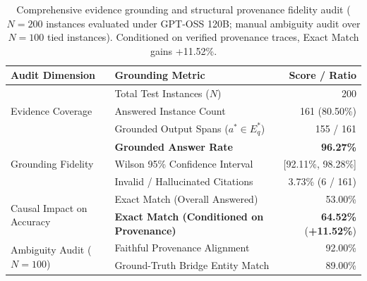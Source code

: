 \documentclass[runningheads]{llncs}
\begin{document}
\begin{table}[t]
\caption{Comprehensive evidence grounding and structural provenance fidelity audit ($N=200$ instances evaluated under GPT-OSS 120B; manual ambiguity audit over $N=100$ tied instances). Conditioned on verified provenance traces, Exact Match gains +11.52\%.}
\label{tab:evidence-audit}
\vspace{0.5mm}
\centering
\scriptsize
\renewcommand{\arraystretch}{0.80}
\setlength{\tabcolsep}{7pt}
\begin{tabular}{@{}llr@{}}
\toprule
\textbf{Audit Dimension} & \textbf{Grounding Metric} & \textbf{Score / Ratio} \\
\midrule
\multirow{3}{*}{Evidence Coverage} 
  & Total Test Instances ($N$)           & 200 \\
  & Answered Instance Count              & 161 (80.50\%) \\
  & Grounded Output Spans ($a^* \in E_q^*$) & 155 / 161 \\
\midrule
\multirow{3}{*}{Grounding Fidelity} 
  & \textbf{Grounded Answer Rate}        & \textbf{96.27\%} \\
  & Wilson 95\% Confidence Interval      & [92.11\%, 98.28\%] \\
  & Invalid / Hallucinated Citations    & 3.73\% (6 / 161) \\
\midrule
\multirow{2}{*}{Causal Impact on Accuracy} 
  & Exact Match (Overall Answered)       & 53.00\% \\
  & \textbf{Exact Match (Conditioned on Provenance)} & \textbf{64.52\%} (\textbf{+11.52\%}) \\
\midrule
\multirow{2}{*}{Ambiguity Audit ($N=100$)} 
  & Faithful Provenance Alignment        & 92.00\% \\
  & Ground-Truth Bridge Entity Match     & 89.00\% \\
\bottomrule
\end{tabular}
\vspace{0.5mm}
\end{table}
\end{document}
